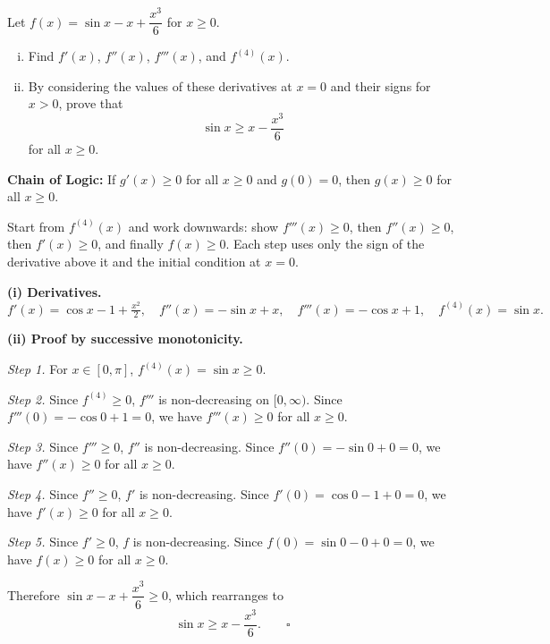 \begin{problem}
Let $f(x) = \sin x - x + \dfrac{x^3}{6}$ for $x \ge 0$.

\begin{enumerate}[(i)]
  \item Find $f'(x)$, $f''(x)$, $f'''(x)$, and $f^{(4)}(x)$.
  \item By considering the values of these derivatives at $x = 0$ and their signs for $x > 0$,
        prove that
        \[
        \sin x \ge x - \frac{x^3}{6}
        \]
        for all $x \ge 0$.
\end{enumerate}
\end{problem}

\begin{hintbox}
\textbf{Chain of Logic:} If $g'(x) \ge 0$ for all $x \ge 0$ and $g(0) = 0$, then $g(x) \ge 0$
for all $x \ge 0$.

Start from $f^{(4)}(x)$ and work downwards: show $f'''(x) \ge 0$, then $f''(x) \ge 0$, then
$f'(x) \ge 0$, and finally $f(x) \ge 0$.  Each step uses only the sign of the derivative above
it and the initial condition at $x = 0$.
\end{hintbox}

\begin{solution}
\textbf{(i) Derivatives.}
\[
f'(x) = \cos x - 1 + \tfrac{x^2}{2},\quad
f''(x) = -\sin x + x,\quad
f'''(x) = -\cos x + 1,\quad
f^{(4)}(x) = \sin x.
\]

\textbf{(ii) Proof by successive monotonicity.}

\textit{Step 1.} For $x \in [0, \pi]$, $f^{(4)}(x) = \sin x \ge 0$.

\textit{Step 2.} Since $f^{(4)} \ge 0$, $f'''$ is non-decreasing on $[0,\infty)$.
Since $f'''(0) = -\cos 0 + 1 = 0$, we have $f'''(x) \ge 0$ for all $x \ge 0$.

\textit{Step 3.} Since $f''' \ge 0$, $f''$ is non-decreasing.
Since $f''(0) = -\sin 0 + 0 = 0$, we have $f''(x) \ge 0$ for all $x \ge 0$.

\textit{Step 4.} Since $f'' \ge 0$, $f'$ is non-decreasing.
Since $f'(0) = \cos 0 - 1 + 0 = 0$, we have $f'(x) \ge 0$ for all $x \ge 0$.

\textit{Step 5.} Since $f' \ge 0$, $f$ is non-decreasing.
Since $f(0) = \sin 0 - 0 + 0 = 0$, we have $f(x) \ge 0$ for all $x \ge 0$.

Therefore $\sin x - x + \dfrac{x^3}{6} \ge 0$, which rearranges to
\[
\sin x \ge x - \frac{x^3}{6}.\qquad\square
\]
\end{solution}

